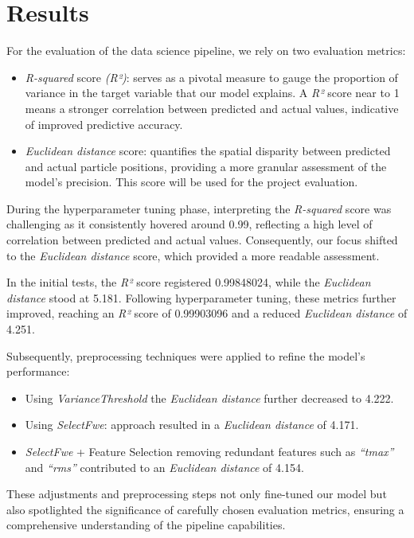 \documentclass[conference]{IEEEtran}
\begin{document}
\section{Results}
For the evaluation of the data science pipeline, we rely on two evaluation metrics:
\begin{itemize}
    \item \textit{R-squared} score \textit{(R²)}: serves as a pivotal measure to gauge the proportion 
    of variance in the target variable that our model explains. A \textit{R²} score near to 1 
    means a stronger correlation between predicted and actual values, indicative of 
    improved predictive accuracy.
    \item \textit{Euclidean distance} score: quantifies the spatial disparity between predicted and 
    actual particle positions, providing a more granular assessment of the model's 
    precision. \cite{OpenAI_ChatGPT_help_me_on_this}
    This score will be used for the project evaluation.\\
\end{itemize}

During the hyperparameter tuning phase, interpreting the \textit{R-squared} score was 
challenging as it consistently hovered around 0.99, reflecting a high level of correlation 
between predicted and actual values. Consequently, our focus shifted to the 
\textit{Euclidean distance} score, which provided a more readable assessment.

In the initial tests, the \textit{R²} score registered 0.99848024, while the \textit{Euclidean 
distance} stood at 5.181. Following hyperparameter tuning, these metrics further improved, 
reaching an \textit{R²} score of 0.99903096 and a reduced \textit{Euclidean distance} of 4.251.

Subsequently, preprocessing techniques were applied to refine the model's performance:
\begin{itemize}
    \item Using \textit{VarianceThreshold} the \textit{Euclidean distance} further decreased to 4.222.
    \item Using \textit{SelectFwe}: approach resulted in a \textit{Euclidean distance} of 4.171.
    \item \textit{SelectFwe} + Feature Selection removing redundant features such 
    as \textit{“tmax”} and \textit{“rms”} contributed to an 
    \textit{Euclidean distance} of 4.154.
\end{itemize}

These adjustments and preprocessing steps not only fine-tuned our model but also spotlighted 
the significance of carefully chosen evaluation metrics, ensuring a comprehensive understanding 
of the pipeline capabilities.\\
\end{document}
